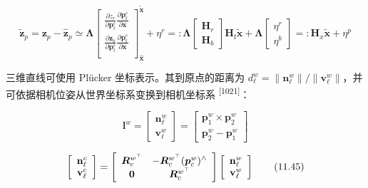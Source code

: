 \begin{equation}
\tilde {\boldsymbol {z}} _ {p} = \boldsymbol {z} _ {p} - \hat {\boldsymbol {z}} _ {p} \simeq \boldsymbol {\Lambda} \left[ \begin{array}{l} \frac {\partial z _ {r}}{\partial \boldsymbol {p} _ {\mathrm{f}} ^ {c}} \frac {\partial \boldsymbol {p} _ {\mathrm{f}} ^ {c}}{\partial \boldsymbol {x}} \\ \frac {\partial \boldsymbol {z} _ {b}}{\partial \boldsymbol {p} _ {\mathrm{f}} ^ {c}} \frac {\partial \boldsymbol {p} _ {\mathrm{f}} ^ {c}}{\partial \boldsymbol {x}} \\ \end{array} \right] _ {\hat {\boldsymbol {x}}} ^ {\boldsymbol {\tilde {x}}} + \eta^ {r} =: \boldsymbol {\Lambda} \left[ \begin{array}{l} \mathbf {H} _ {r} \\ \mathbf {H} _ {b} \end{array} \right] \mathbf {H} _ {\mathrm{f}} \tilde {\boldsymbol {x}} + \boldsymbol {\Lambda} \left[ \begin{array}{l} \eta^ {r} \\ \eta^ {b} \end{array} \right] =: \mathbf {H} _ {x} \tilde {\boldsymbol {x}} + \eta^ {p}\tag{11.43}
\end{equation}

三维直线可使用 Plücker 坐标表示。其到原点的距离为 $d_\ell^w=\|\mathbf n_\ell^w\|/\|\mathbf v_\ell^w\|$，并可依据相机位姿从世界坐标系变换到相机坐标系 \textsuperscript{[1021]}：

\begin{equation}
\mathbf {l} ^ {w} = \left[ \begin{array}{c} \mathbf {n} _ {\ell} ^ {w} \\ \mathbf {v} _ {\ell} ^ {w} \end{array} \right] = \left[ \begin{array}{c} \mathbf {p} _ {1} ^ {w} \times \mathbf {p} _ {2} ^ {w} \\ \mathbf {p} _ {2} ^ {w} - \mathbf {p} _ {1} ^ {w} \end{array} \right]\tag{11.44}
\end{equation}

\begin{equation}
\left[ \begin{array}{c} \mathbf {n} _ {\ell} ^ {c} \\ \mathbf {v} _ {\ell} ^ {c} \end{array} \right] = \left[ \begin{array}{c c} \boldsymbol {R} _ {c} ^ {w ^ {\top}} & - \boldsymbol {R} _ {c} ^ {w ^ {\top}} (\boldsymbol {p} _ {c} ^ {w}) ^ {\wedge} \\ \boldsymbol {0} & \boldsymbol {R} _ {c} ^ {w ^ {\top}} \end{array} \right] \left[ \begin{array}{c} \mathbf {n} _ {\ell} ^ {w} \\ \mathbf {v} _ {\ell} ^ {w} \end{array} \right]\tag{11.45}
\end{equation}

